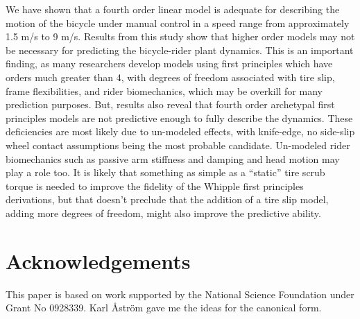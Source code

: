 \documentclass[a4paper]{article}
\begin{document}
We have shown that a fourth order linear model is adequate for describing the
motion of the bicycle under manual control in a speed range from approximately
1.5 m/s to 9 m/s. Results from this study show that higher order models may
not be necessary for predicting the bicycle-rider plant dynamics. This is an
important finding, as many researchers develop models using first principles
which have orders much greater than 4, with degrees of freedom associated with
tire slip, frame flexibilities, and rider biomechanics, which may be overkill
for many prediction purposes. But, results also reveal that fourth order
archetypal first principles models are not predictive enough to fully describe
the dynamics. These deficiencies are most likely due to un-modeled effects,
with knife-edge, no side-slip wheel contact assumptions being the most probable
candidate. Un-modeled rider biomechanics such as passive arm stiffness and
damping and head motion may play a role too. It is likely that something as
simple as a ``static'' tire scrub torque is needed to improve the fidelity of
the Whipple first principles derivations, but that doesn't preclude that the
addition of a tire slip model, adding more degrees of freedom, might also
improve the predictive ability.

\section*{Acknowledgements}

This paper is based on work supported by the National Science Foundation under
Grant No 0928339. Karl {\AA}str{\"o}m gave me the ideas for the canonical form.




\end{document}
